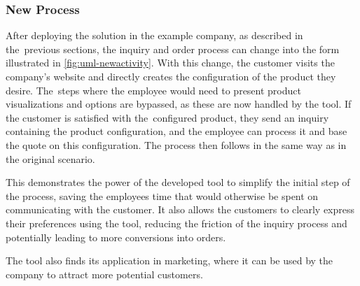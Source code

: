 \subsubsection{New Process}

After deploying the solution in the example company, as described in the~previous sections, the inquiry and order process can change into the form illustrated in \autoref{fig:uml-newactivity}. With this change, the customer visits the company's website and directly creates the configuration of the product they desire. The~steps where the employee would need to present product visualizations and options are bypassed, as these are now handled by the tool. If the customer is satisfied with the~configured product, they send an inquiry containing the product configuration, and the employee can process it and base the quote on this configuration. The process then follows in the same way as in the original scenario.

This demonstrates the power of the developed tool to simplify the initial step of the process, saving the employees time that would otherwise be spent on communicating with the customer. It also allows the customers to clearly express their preferences using the tool, reducing the friction of the inquiry process and potentially leading to more conversions into orders.

The tool also finds its application in marketing, where it can be used by the company to attract more potential customers.
